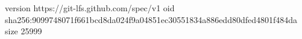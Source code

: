 version https://git-lfs.github.com/spec/v1
oid sha256:9099748071f661bcd8da024f9a04851ec30551834a886edd80dfed4801f484da
size 25999
